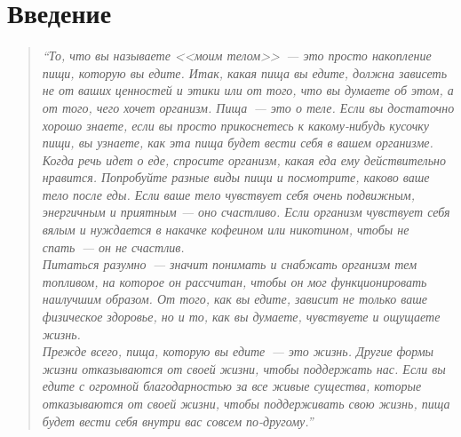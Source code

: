 \section{Введение}


\begin{quote}
\textit{``То, что вы называете <<моим телом>>~--- это просто накопление пищи, которую вы едите. Итак, какая пища вы едите, должна зависеть не от ваших ценностей и этики или от того, что вы думаете об этом, а от того, чего хочет организм. Пища~--- это о теле. Если вы достаточно хорошо знаете, если вы просто прикоснетесь к какому-нибудь кусочку пищи, вы узнаете, как эта пища будет вести себя в вашем организме.
\\[3pt]
Когда речь идет о еде, спросите организм, какая еда ему действительно нравится. Попробуйте разные виды пищи и посмотрите, каково ваше тело после еды. Если ваше тело чувствует себя очень подвижным, энергичным и приятным --- оно счастливо. Если организм чувствует себя вялым и нуждается в накачке кофеином или никотином, чтобы не спать~--- он не счастлив.
\\[3pt]
Питаться разумно~--- значит понимать и снабжать организм тем топливом, на которое он рассчитан, чтобы он мог функционировать наилучшим образом. От того, как вы едите, зависит не только ваше физическое здоровье, но и то, как вы думаете, чувствуете и ощущаете жизнь.
\\[3pt]
Прежде всего, пища, которую вы едите~--- это жизнь. Другие формы жизни отказываются от своей жизни, чтобы поддержать нас. Если вы едите с огромной благодарностью за все живые существа, которые отказываются от своей жизни, чтобы поддерживать свою жизнь, пища будет вести себя внутри вас совсем по-другому.''
\\[5pt]
}
\end{quote}
